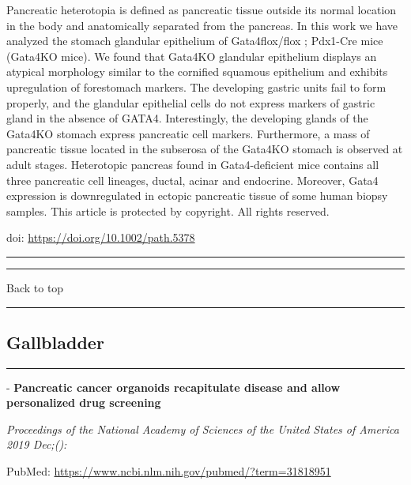 \documentclass[
]{article}
\renewcommand{\linethickness}{0.05em}
\begin{document}
Pancreatic heterotopia is defined as pancreatic tissue outside its
normal location in the body and anatomically separated from the
pancreas. In this work we have analyzed the stomach glandular epithelium
of Gata4flox/flox ; Pdx1-Cre mice (Gata4KO mice). We found that Gata4KO
glandular epithelium displays an atypical morphology similar to the
cornified squamous epithelium and exhibits upregulation of forestomach
markers. The developing gastric units fail to form properly, and the
glandular epithelial cells do not express markers of gastric gland in
the absence of GATA4. Interestingly, the developing glands of the
Gata4KO stomach express pancreatic cell markers. Furthermore, a mass of
pancreatic tissue located in the subserosa of the Gata4KO stomach is
observed at adult stages. Heterotopic pancreas found in Gata4-deficient
mice contains all three pancreatic cell lineages, ductal, acinar and
endocrine. Moreover, Gata4 expression is downregulated in ectopic
pancreatic tissue of some human biopsy samples. This article is
protected by copyright. All rights reserved.

doi: \url{https://doi.org/10.1002/path.5378}

\begin{center}\rule{0.5\linewidth}{\linethickness}\end{center}

\begin{center}\rule{0.5\linewidth}{\linethickness}\end{center}

Back to top

\begin{center}\rule{0.5\linewidth}{\linethickness}\end{center}

\pagebreak

\hypertarget{gallbladder}{%
\subsection{Gallbladder}\label{gallbladder}}

\begin{center}\rule{0.5\linewidth}{\linethickness}\end{center}

- \textbf{Pancreatic cancer organoids recapitulate disease and allow
personalized drug screening}

\emph{Proceedings of the National Academy of Sciences of the United
States of America 2019 Dec;():}

PubMed: \url{https://www.ncbi.nlm.nih.gov/pubmed/?term=31818951}
\end{document}
